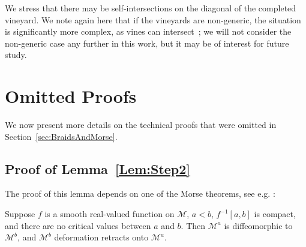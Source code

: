 \documentclass[twoside,leqno]{article}
\newcommand{\M}{\mathcal{M}}
\begin{document}
We stress that there may be self-intersections on the diagonal of the completed vineyard. We note again here that if the vineyards are non-generic, the situation is significantly more complex, as vines can intersect~\cite{turner2023representing}; we will not consider the non-generic case any further in this work, but it may be of interest for future study.


%

%

%
%

%
%

%
%

%

\section{Omitted Proofs}
\label{appendix:proofs}

We now present more details on the technical proofs that were omitted in Section~\ref{sec:BraidsAndMorse}.

\subsection{Proof of Lemma~\ref{Lem:Step2}}

The proof of this lemma depends on one of the Morse theorems, see e.g. \cite[Theorem~3.1]{milnor1963morse}:
\begin{theorem}[Morse]\label{th:Morse} 
Suppose $f$ is a smooth real-valued function on $\M$, $a < b$, $f^{-1} [ a , b ]$ is compact, and there are no critical values between $a$ and $b$. Then $\M^a$ is diffeomorphic to $\M^{b}$, and $\M^{b}$ deformation retracts onto $\M^{a}$. 
\end{theorem}
\end{document}

